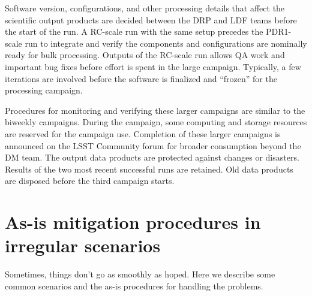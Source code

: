 \documentclass[DM,authoryear,toc]{lsstdoc}
\begin{document}
Software version, configurations, and other processing details that
affect the scientific output products are decided between the DRP
and LDF teams before the start of the run. A RC-scale run with the
same setup precedes the PDR1-scale run to integrate and verify the
components and configurations are nominally ready for bulk processing.
Outputs of the RC-scale run allows QA work and important bug fixes
before effort is spent in the large campaign.  Typically, a few
iterations are involved before the software is finalized and “frozen”
for the processing campaign.

Procedures for monitoring and verifying these larger campaigns are
similar to the biweekly campaigns. During the campaign, some computing
and storage resources are reserved for the campaign use. Completion
of these larger campaigns is announced on the LSST Community forum
for broader consumption beyond the DM team. The output data products
are protected against changes or disasters. Results of the two most
recent successful runs are retained.  Old data products are disposed
before the third campaign starts.

\section{As-is mitigation procedures in irregular scenarios}
\label{sec:scenarios}

Sometimes, things don’t go as smoothly as hoped. Here we describe
some common scenarios and the as-is procedures for handling the
problems.
\end{document}
